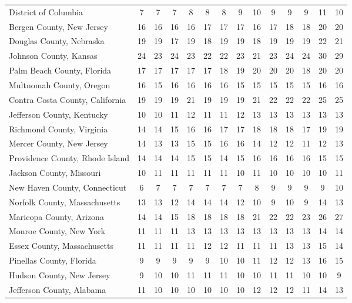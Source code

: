 \begin{landscape}
\begin{longtable}{lccccccccccccc}
	District of Columbia & 7 & 7 & 7 & 8 & 8 & 8 & 9 & 10 & 9 & 9 & 9 & 11 & 10 \\
	Bergen County, New Jersey & 16 & 16 & 16 & 16 & 17 & 17 & 17 & 16 & 17 & 18 & 18 & 20 & 20 \\
	Douglas County, Nebraska & 19 & 19 & 17 & 19 & 18 & 19 & 19 & 18 & 19 & 19 & 19 & 22 & 21 \\
	Johnson County, Kansas & 24 & 23 & 24 & 23 & 22 & 22 & 23 & 21 & 23 & 24 & 24 & 30 & 29 \\
	Palm Beach County, Florida & 17 & 17 & 17 & 17 & 17 & 18 & 19 & 20 & 20 & 20 & 18 & 20 & 20 \\
	Multnomah County, Oregon & 16 & 15 & 16 & 16 & 16 & 16 & 15 & 15 & 15 & 15 & 15 & 16 & 16 \\
	Contra Costa County, California & 19 & 19 & 19 & 21 & 19 & 19 & 19 & 21 & 22 & 22 & 22 & 25 & 25 \\
	Jefferson County, Kentucky & 10 & 10 & 11 & 12 & 11 & 11 & 12 & 13 & 13 & 13 & 13 & 13 & 13 \\
	Richmond County, Virginia & 14 & 14 & 15 & 16 & 16 & 17 & 17 & 18 & 18 & 18 & 17 & 19 & 19 \\
	Mercer County, New Jersey & 14 & 13 & 13 & 15 & 15 & 16 & 16 & 14 & 12 & 12 & 11 & 12 & 13 \\
	Providence County, Rhode Island & 14 & 14 & 14 & 15 & 15 & 14 & 15 & 16 & 16 & 16 & 16 & 15 & 15 \\
	Jackson County, Missouri & 10 & 11 & 11 & 11 & 11 & 11 & 10 & 11 & 10 & 10 & 10 & 10 & 11 \\
	New Haven County, Connecticut & 6 & 7 & 7 & 7 & 7 & 7 & 7 & 8 & 9 & 9 & 9 & 9 & 10 \\
	Norfolk County, Massachusetts & 13 & 13 & 12 & 14 & 14 & 14 & 12 & 10 & 9 & 10 & 9 & 14 & 13 \\
	Maricopa County, Arizona & 14 & 14 & 15 & 18 & 18 & 18 & 18 & 21 & 22 & 22 & 23 & 26 & 27 \\
	Monroe County, New York & 11 & 11 & 11 & 13 & 13 & 13 & 13 & 13 & 13 & 13 & 13 & 14 & 14 \\
	Essex County, Massachusetts & 11 & 11 & 11 & 11 & 12 & 12 & 11 & 11 & 11 & 13 & 13 & 15 & 14 \\
	Pinellas County, Florida & 9 & 9 & 9 & 9 & 9 & 10 & 10 & 11 & 12 & 12 & 13 & 16 & 15 \\
	Hudson County, New Jersey & 9 & 10 & 10 & 11 & 11 & 11 & 10 & 10 & 11 & 11 & 10 & 10 & 9 \\
	Jefferson County, Alabama & 11 & 10 & 10 & 10 & 10 & 10 & 10 & 12 & 12 & 12 & 11 & 14 & 13 \\

\end{longtable}
\end{landscape}
